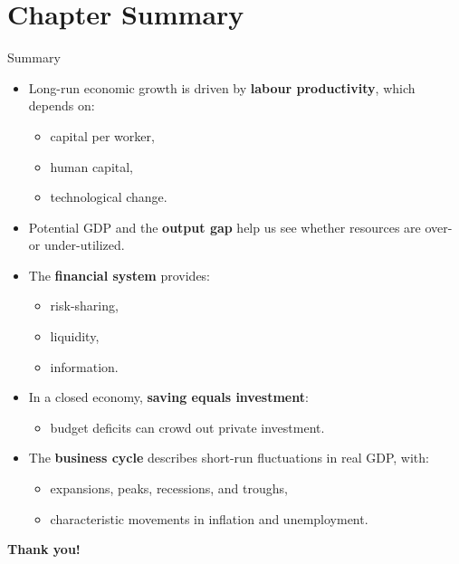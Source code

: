 \documentclass[aspectratio=169]{beamer}
\begin{document}
\section*{Chapter Summary}

\begin{frame}{Summary}
\transfade
\begin{itemize}
  \item Long-run economic growth is driven by \textbf{labour productivity}, which depends on:
  \begin{itemize}
    \item capital per worker,
    \item human capital,
    \item technological change.
  \end{itemize}
  \item Potential GDP and the \textbf{output gap} help us see whether resources are over- or under-utilized.
  \item The \textbf{financial system} provides:
  \begin{itemize}
    \item risk-sharing,
    \item liquidity,
    \item information.
  \end{itemize}
  \item In a closed economy, \textbf{saving equals investment}:
  \begin{itemize}
    \item budget deficits can crowd out private investment.
  \end{itemize}
  \item The \textbf{business cycle} describes short-run fluctuations in real GDP, with:
  \begin{itemize}
    \item expansions, peaks, recessions, and troughs,
    \item characteristic movements in inflation and unemployment.
  \end{itemize}
\end{itemize}
\end{frame}

\begin{frame}
\centering
\Huge \textbf{Thank you!}
\end{frame}
\end{document}
